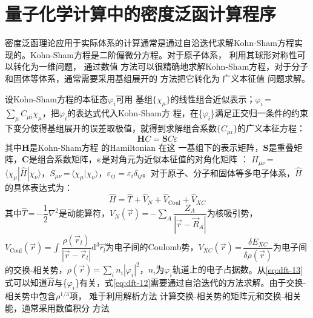 \section{量子化学计算中的密度泛函计算{程序}}
密度泛函理论应用于实际体系的计算通常是通过自洽迭代求解Kohn-Sham方程实现的。Kohn-Sham方程是二阶偏微分方程{。}对于原子体系，%
{利用其球形对称性可以转化为}一维问题，%
通过数值%
方法{可以}很精确地求解Kohn-Sham方程，对于分子和固体等体系，通常需要采用基组展开的%
{方}法把它转化为%
广义本征值%
{问题}求解。%

设Kohn-Sham方程的本征态$\varphi_i$可用%
基组$\{\chi_{\mu}\}$的线性组合近似表示；$\varphi_i$\,=\,$\sum\limits_{\mu}C_{\mu i}\chi_{\mu}$，把$\varphi_i$的表达式代入Kohn-Sham方%
{程，在\{$\varphi_i$\}满足正交归一条件的约束下变分使得基组展开的误差取极值，就}得到求解组合系数$\{C_{\mu i}\}$的广义本征方程：
\begin{equation} \label{eq:dft-12}
{\mathbf HC}={\mathbf SC\varepsilon}
\end{equation}
其中$\mathbf H$是Kohn-Sham方程%
的Hamiltonian%
在这%
{一}基组下的表示矩阵，$\mathbf S$是重叠矩阵，$\mathbf C$是组合系数矩阵，${\mathbf\varepsilon}$是对角元为近似本征值的对角化矩阵%
{：}%
$H_{\mu\nu}$\,=\,$\langle\chi_{\mu}|\hat{H}|\chi_{\nu}\rangle$，\linebreak$S_{\mu\nu}$\,=\,$\langle\chi_{\mu}|\chi_{\nu}\rangle$，$\varepsilon_{ij}=\varepsilon_i\delta_{ij}$。对于原子、分子和固体等多电子体系，$\hat{H}$的具体表达式为：
\begin{equation} \label{eq:dft-13}
  \hat{H}=\hat{T}+\hat{V}_N+\hat{V}_{\mathrm{Coul}}+\hat{V}_{XC}
\end{equation}
其中$\hat{T}$\,=\,$-\dfrac12\nabla^2$是动能算符，$V_N(\vec{r})$\,=\,$-\sum\limits_A\dfrac{Z_A}{|\vec{r}-\vec{R}_A|}$为核吸引势，\\$V_{\mathrm{Coul}}(\vec{r})$\,=\,$\displaystyle\int{\dfrac{\rho(\vec r_l)}{|\vec{r}-\vec r_l|}\textrm{d}^3\vec{r_l}}$为电子间的Coulomb势，$V_{XC}(\vec{r})$\,=\,$\dfrac{\delta E_{XC}}{\delta\rho(\vec{r})}$为电子间的交换-相关势{，$\rho(\vec r)$\,=\,$\sum\limits_in_i|\varphi_i|^2$，$n_i$为$\varphi_i$轨道上的电子占据数}。从\eqref{eq:dft-13}式可以知道$\hat{H}$与{\{}$\varphi_i${\}}有关，式\eqref{eq:dft-12}需要通过自洽迭代的方法求解。由于交换-相关势中包含$\rho^{1/3}$项，%
难{于}利用解析方法%
{计算}交换-相关势的矩阵元和交换-相关能，通常{采}用数值积分%
方法%
